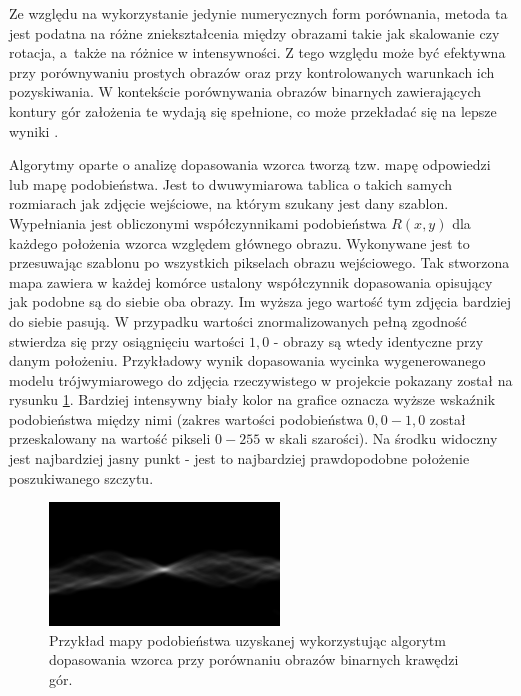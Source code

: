 Ze względu na wykorzystanie jedynie numerycznych form porównania, metoda ta jest podatna na różne zniekształcenia między obrazami takie jak skalowanie czy rotacja, a~także na różnice w intensywności. Z tego względu może być efektywna przy porównywaniu prostych obrazów oraz przy kontrolowanych warunkach ich pozyskiwania. W kontekście porównywania obrazów binarnych zawierających kontury gór założenia te wydają się spełnione, co może przekładać się na lepsze wyniki \cite{feature_vs_template}.

Algorytmy oparte o analizę dopasowania wzorca tworzą tzw. mapę odpowiedzi lub mapę podobieństwa. Jest to dwuwymiarowa tablica o takich samych rozmiarach jak zdjęcie wejściowe, na którym szukany jest dany szablon. Wypełniania jest obliczonymi współczynnikami podobieństwa $R(x,y)$ dla każdego położenia wzorca względem głównego obrazu. Wykonywane jest to przesuwając szablonu po wszystkich pikselach obrazu wejściowego. Tak stworzona mapa zawiera w każdej komórce ustalony współczynnik dopasowania opisujący jak podobne są do siebie oba obrazy. Im wyższa jego wartość tym zdjęcia bardziej do siebie pasują. W przypadku wartości znormalizowanych pełną zgodność stwierdza się przy osiągnięciu wartości $1,0$ - obrazy są wtedy identyczne przy danym położeniu. Przykładowy wynik dopasowania wycinka wygenerowanego modelu trójwymiarowego do zdjęcia rzeczywistego w projekcie pokazany został na rysunku \ref{fig:template_matching_map}. Bardziej intensywny biały kolor na grafice oznacza wyższe wskaźnik podobieństwa między nimi (zakres wartości podobieństwa $0,0-1,0$ został przeskalowany na wartość pikseli $0-255$ w skali szarości). Na środku widoczny jest najbardziej jasny punkt - jest to najbardziej prawdopodobne położenie poszukiwanego szczytu. 


\begin{figure}[!h]
    \centering \includegraphics[width=0.6\linewidth]{img/template_matching_map.png}
    \caption{Przykład mapy podobieństwa uzyskanej wykorzystując algorytm dopasowania wzorca przy porównaniu obrazów binarnych krawędzi gór.}
    \label{fig:template_matching_map}
\end{figure}


